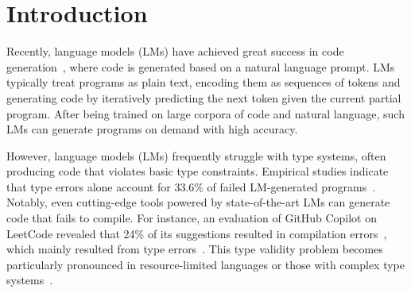 \documentclass[manuscript,screen]{acmart}
\begin{document}
\section{Introduction} \label{section:intro}
Recently, language models (LMs) have achieved great success in code generation~\cite{li2022competition, DBLP:conf/pldi/Xu0NH22, zheng2023codegeex, DBLP:journals/corr/abs-2108-07732}, where code is generated based on a natural language prompt.
%
LMs typically treat programs as plain text, encoding them as sequences of tokens and generating code by iteratively predicting the next token given the current partial program. After being trained on large corpora of code and natural language, such LMs can generate programs on demand with high accuracy.

However, language models (LMs) frequently struggle with type systems, often producing code that violates basic type constraints. 
Empirical studies indicate that type errors alone account for 33.6\% of failed LM-generated programs~\cite{DBLP:journals/ese/TambonDNKDA25, DBLP:journals/corr/abs-2407-06153}. 
Notably, even cutting-edge tools powered by state-of-the-art LMs can generate code that fails to compile.
For instance, an evaluation of GitHub Copilot on LeetCode revealed that 24\% of its suggestions resulted in compilation errors~\cite{DBLP:conf/msr/NguyenN22}, which mainly resulted from type errors~\cite{DBLP:journals/corr/abs-2504-09246}. 
This type validity problem becomes particularly pronounced in resource-limited languages or those with complex type systems~\cite{DBLP:journals/corr/abs-2406-00515,DBLP:journals/corr/abs-2410-03981}.
\end{document}
